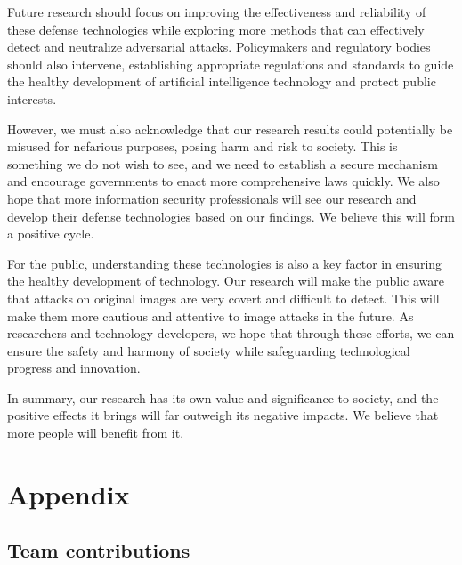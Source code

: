 Future research should focus on improving the effectiveness and reliability of these defense technologies while exploring more methods that can effectively detect and neutralize adversarial attacks. Policymakers and regulatory bodies should also intervene, establishing appropriate regulations and standards to guide the healthy development of artificial intelligence technology and protect public interests.

However, we must also acknowledge that our research results could potentially be misused for nefarious purposes, posing harm and risk to society. This is something we do not wish to see, and we need to establish a secure mechanism and encourage governments to enact more comprehensive laws quickly. We also hope that more information security professionals will see our research and develop their defense technologies based on our findings. We believe this will form a positive cycle.

For the public, understanding these technologies is also a key factor in ensuring the healthy development of technology. Our research will make the public aware that attacks on original images are very covert and difficult to detect. This will make them more cautious and attentive to image attacks in the future. As researchers and technology developers, we hope that through these efforts, we can ensure the safety and harmony of society while safeguarding technological progress and innovation.

In summary, our research has its own value and significance to society, and the positive effects it brings will far outweigh its negative impacts. We believe that more people will benefit from it.

\newpage
\section*{Appendix}

\subsection*{Team contributions}

